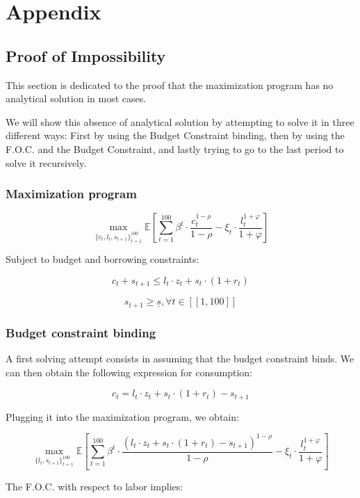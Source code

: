 \documentclass{article}
\begin{document}
\newpage
\section{Appendix}

\subsection{Proof of Impossibility}

This section is dedicated to the proof that the maximization program
has no analytical solution in most cases.

We will show this absence of analytical solution by attempting to solve it in three different 
ways: First by using the Budget Constraint binding, then by using the F.O.C. and the Budget Constraint,
and lastly trying to go to the last period to solve it recursively. 

\subsubsection{Maximization program}

$$ \max_{\{c_{t},l_{t},s_{t+1}\}_{t=1}^{100}}
{\mathbb{E}\left[\sum_{t=1}^{100} \beta^{t}\cdot \frac{c_{t}^{1-\rho}}{1-\rho}-\xi_{t}\cdot \frac{l_{t}^{1+\varphi}}{1+\varphi}\right]}$$

Subject to budget and borrowing constraints:

$$c_{t} + s_{t+1} \leq l_{t}\cdot z_{t} + s_{t}\cdot(1+r_{t})$$

$$s_{t+1}\geq \underline{s}, \forall t \in [\![1,100]\!]$$

\subsubsection{Budget constraint binding}

A first solving attempt consists in assuming that the budget constraint binds.
We can then obtain the following expression for consumption: 

$$c_{t} = l_{t}\cdot z_{t} + s_{t}\cdot(1+r_{t}) - s_{t+1}$$

Plugging it into the maximization program, we obtain:

$$ \max_{\{l_{t},s_{t+1}\}_{t=1}^{100}}
{\mathbb{E}\left[\sum_{t=1}^{100} \beta^{t}\cdot \frac{\left(l_{t}\cdot z_{t} + s_{t}\cdot(1+r_{t}) - s_{t+1}\right)^{1-\rho}}{1-\rho}-\xi_{t}\cdot \frac{l_{t}^{1+\varphi}}{1+\varphi}\right]}$$

The F.O.C. with respect to labor implies: 
\end{document}
